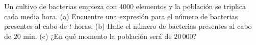 \item Un cultivo de bacterias empieza con $4000$ elementos y la población se triplica cada media hora. (a) Encuentre una expresión para el número de bacterias presentes al cabo de $t$ horas. (b) Halle el número de bacterias presentes al cabo de $20 \text{ min}$. (c) ¿En qué momento la población será de $20\,000$?
